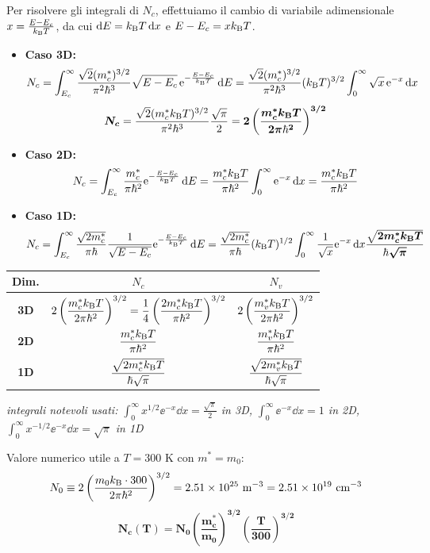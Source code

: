Per risolvere gli integrali di $N_c$, effettuiamo il cambio di variabile adimensionale $x = \frac{E-E_c}{k_{\mathrm{B}} T}$, da cui $\mathrm{d} E = k_{\mathrm{B}} T\,\mathrm{d} x$ e $E-E_c = xk_{\mathrm{B}} T$.
\begin{itemize}
    \item \textbf{Caso 3D:}
\[ N_c = \int_{E_c}^{\infty} \frac{\sqrt{2}(m_c^*)^{3/2}}{\pi^2\hbar^3}\sqrt{E-E_c} \, \mathrm{e}^{-\frac{E-E_c}{k_{\mathrm{B}} T}}\,\mathrm{d} E = \frac{\sqrt{2}(m_c^*)^{3/2}}{\pi^2\hbar^3} (k_{\mathrm{B}} T)^{3/2} \int_0^\infty \sqrt{x}\, \mathrm{e}^{-x}\,\mathrm{d} x \]
\[ \bm{N_c} = \frac{\sqrt{2}(m_c^*k_{\mathrm{B}} T)^{3/2}}{\pi^2\hbar^3} \frac{\sqrt{\pi}}{2} = \bm{2 \left( \frac{m_c^*k_{\mathrm{B}} T}{2\pi\hbar^2} \right)^{3/2}} \]

\item \textbf{Caso 2D:}
\[ N_c = \int_{E_c}^{\infty} \frac{m_c^*}{\pi\hbar^2} \mathrm{e}^{-\frac{E-E_c}{k_{\mathrm{B}} T}}\,\mathrm{d} E = \frac{m_c^*k_{\mathrm{B}} T}{\pi\hbar^2} \int_0^\infty \mathrm{e}^{-x}\,\mathrm{d} x  = \frac{m_c^*k_{\mathrm{B}} T}{\pi\hbar^2} \]

\item \textbf{Caso 1D:}
\[ N_c = \int_{E_c}^{\infty} \frac{\sqrt{2m_c^*}}{\pi\hbar}\frac{1}{\sqrt{E-E_c}} \mathrm{e}^{-\frac{E-E_c}{k_{\mathrm{B}} T}}\,\mathrm{d} E = \frac{\sqrt{2m_c^*}}{\pi\hbar} (k_{\mathrm{B}} T)^{1/2} \int_0^\infty \frac{1}{\sqrt{x}} \mathrm{e}^{-x}\,\mathrm{d} x  \bm{\frac{\sqrt{2m_c^*k_{\mathrm{B}} T}}{\hbar\sqrt{\pi}}} \]
\end{itemize}


\begin{center}
\renewcommand{\arraystretch}{2.0}
\begin{tabular}{c c c}
\toprule
Dim. & $N_c$ & $N_v$ \\
\midrule
\textbf{3D} & $2\left(\dfrac{m_c^*k_{\mathrm{B}} T}{2\pi\hbar^2}\right)^{3/2} = \dfrac14\left(\dfrac{2m_c^*k_{\mathrm{B}} T}{\pi\hbar^2}\right)^{3/2}$
            & $2\left(\dfrac{m_v^*k_{\mathrm{B}} T}{2\pi\hbar^2}\right)^{3/2}$ \\
\textbf{2D} & $\dfrac{m_c^*k_{\mathrm{B}} T}{\pi\hbar^2}$ & $\dfrac{m_v^*k_{\mathrm{B}} T}{\pi\hbar^2}$ \\
\textbf{1D} & $\dfrac{\sqrt{2m_c^*k_{\mathrm{B}} T}}{\hbar\sqrt{\pi}}$ & $\dfrac{\sqrt{2m_v^*k_{\mathrm{B}} T}}{\hbar\sqrt{\pi}}$ \\
\bottomrule
\end{tabular}
\end{center}
\textit{integrali notevoli usati: $\int_0^\infty x^{1/2}\ee^{-x}\dd x=\frac{\sqrt\pi}{2}$ in 3D, $\int_0^\infty \ee^{-x}\dd x = 1$ in 2D, $\int_0^\infty x^{-1/2}\ee^{-x}\dd x=\sqrt\pi$ in 1D}



\vspace{0.15cm}
\noindent Valore numerico utile a $T=300$ K con $m^*=m_0$:
\[ N_0 \equiv 2\left(\frac{m_0\kB\cdot300}{2\pi\hbr^2}\right)^{3/2} = 2.51\times10^{25}\ \text{m}^{-3} = 2.51\times10^{19}\ \text{cm}^{-3} \]
\[ \bm{N_c(T) = N_0\left(\frac{m_c^*}{m_0}\right)^{3/2}\left(\frac{T}{300}\right)^{3/2}} \]

